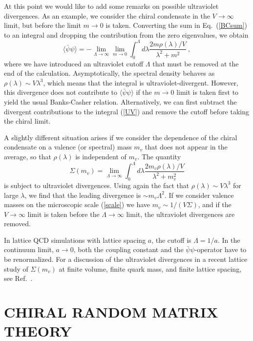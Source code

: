 At this point we would like to add some remarks on possible
ultraviolet divergences.  As an example, we consider the chiral
condensate in the $V\to\infty$ limit, but before the limit $m\to0$ is
taken.  Converting the sum in Eq.~(\ref{BCsum}) to an integral and
dropping the contribution from the zero eigenvalues, we obtain
\begin{equation}
  \label{UV}
  \langle\bar\psi\psi\rangle=-\lim_{\Lambda\to\infty}\lim_{m\to0}
  \int_0^\Lambda d\lambda\frac{2m\rho(\lambda)/V}{\lambda^2+m^2}\:,
\end{equation}
where we have introduced an ultraviolet cutoff $\Lambda$ that must be
removed 
at the end of the calculation.  Asymptotically, the spectral density
behaves as $\rho(\lambda)\sim V\lambda^3$, which means that the
integral is ultraviolet-divergent.  However, this divergence does not
contribute to $\langle\bar\psi\psi\rangle$ if the $m\to0$ limit is
taken first to yield the usual Banks-Casher relation.  Alternatively,
we can first subtract the divergent contributions to the integral
(\ref{UV}) and remove the cutoff before taking the chiral limit.

A slightly different situation arises if we consider the dependence of
the chiral condensate on a valence (or spectral) mass $m_v$ that does
not appear in the average, so that $\rho(\lambda)$ is independent of
$m_v$.  The quantity
\begin{equation}
  \label{UVSigma}
  \Sigma(m_v)=\lim_{\Lambda\to\infty}\int_0^\Lambda d\lambda
  \frac{2m_v\rho(\lambda)/V}{\lambda^2+m_v^2}
\end{equation}
is subject to ultraviolet divergences.  Using again the fact that
$\rho(\lambda)\sim V\lambda^3$ for large $\lambda$, we find that the
leading divergence is $\sim m_v\Lambda^2$.  If we consider valence
masses on the microscopic scale (\ref{scale}) we have
$m_v\sim1/(V\Sigma)$, and if the $V\to\infty$ limit is taken before
the $\Lambda\to\infty$ limit, the ultraviolet divergences are removed.

In lattice QCD simulations with lattice spacing $a$, the cutoff is
$\Lambda=1/a$. In the continuum limit, $ a\rightarrow 0$, both the
coupling constant and the $\bar \psi \psi$-operator have to be
renormalized. For a discussion of the ultraviolet divergences in a recent
lattice study of $\Sigma(m_v)$ at finite volume, finite quark mass,
and finite lattice spacing, see Ref.~\cite{Hernandezmv}.


\section{CHIRAL RANDOM MATRIX THEORY}
\label{sec:chRMT}

